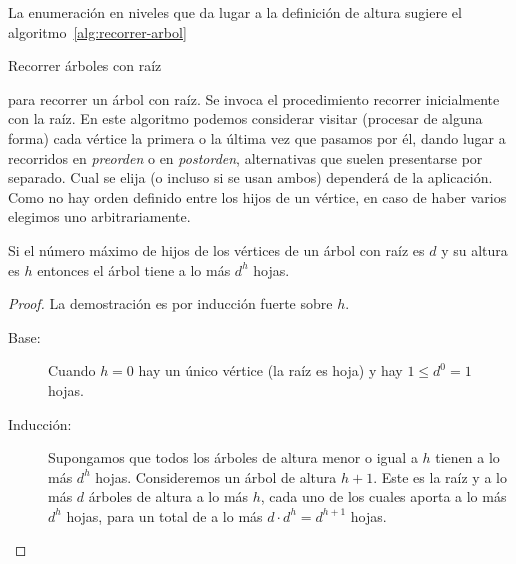   La enumeración en niveles que da lugar a la definición de altura
  sugiere el algoritmo~\ref{alg:recorrer-arbol}
  \begin{algorithm}[htbp]
    \DontPrintSemicolon

    \KwProcedure {} \;
    \BlankLine
    \caption{Recorrer árboles con raíz}
    \label{alg:recorrer-arbol}
  \end{algorithm}
  para recorrer un árbol con raíz.
  Se invoca el procedimiento recorrer inicialmente con la raíz.
  En este algoritmo podemos considerar visitar
  (procesar de alguna forma)
  cada vértice la primera o la última vez que pasamos por él,
  dando lugar a recorridos en \emph{preorden}
  o en \emph{postorden},%
  alternativas que suelen presentarse por separado.
  Cual se elija
  (o incluso si se usan ambos)
  dependerá de la aplicación.
  Como no hay orden definido entre los hijos de un vértice,
  en caso de haber varios elegimos uno arbitrariamente.

  \begin{theorem}
    \label{theo:maximo-hojas}
    Si el número máximo de hijos
    de los vértices de un árbol con raíz es \(d\)
    y su altura es \(h\)
    entonces el árbol tiene a lo más \(d^h\) hojas.
  \end{theorem}
  \begin{proof}
    La demostración es por inducción fuerte sobre \(h\).%
    \begin{description}
    \item[Base:]
      Cuando \(h = 0\) hay un único vértice
      (la raíz es hoja)
      y hay \(1 \le d^0 = 1\) hojas.
    \item[Inducción:]
      Supongamos que todos los árboles
      de altura menor o igual a \(h\)
      tienen a lo más \(d^h\) hojas.
      Consideremos un árbol de altura \(h + 1\).
      Este es la raíz
      y a lo más \(d\) árboles de altura a lo más \(h\),
      cada uno de los cuales aporta a lo más \(d^h\) hojas,
      para un total de	a lo más \(d \cdot d^h = d^{h + 1}\) hojas.
    \qedhere
    \end{description}
  \end{proof}

